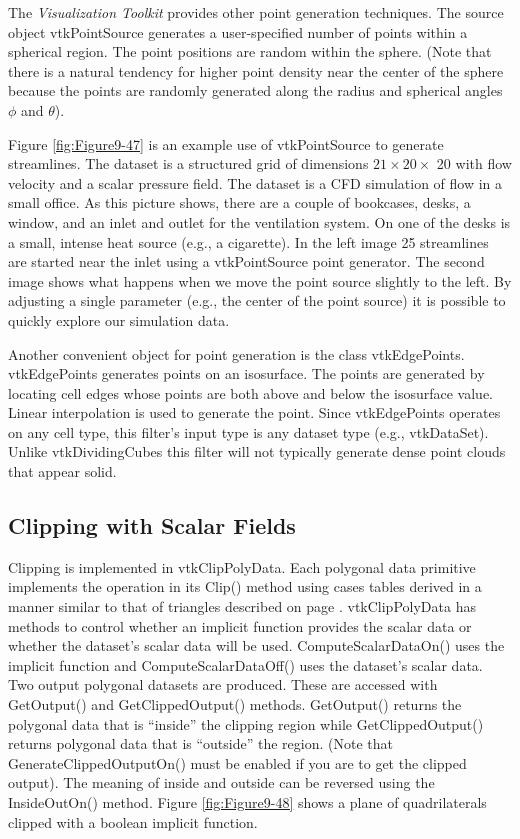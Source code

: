 The \emph{Visualization Toolkit} provides other point generation techniques. The source object vtkPointSource generates a user-specified number of points within a spherical region. The point positions are random within the sphere. (Note that there is a natural tendency for higher point density near the center of the sphere because the points are randomly generated along the radius and spherical angles $\phi$ and $\theta$).

Figure \ref{fig:Figure9-47} is an example use of vtkPointSource to generate streamlines. The dataset is a structured grid of dimensions $21 \times 20 \times$ 20 with flow velocity and a scalar pressure field. The dataset is a CFD simulation of flow in a small office. As this picture shows, there are a couple of bookcases, desks, a window, and an inlet and outlet for the ventilation system. On one of the desks is a small, intense heat source (e.g., a cigarette). In the left image 25 streamlines are started near the inlet using a vtkPointSource point generator. The second image shows what happens when we move the point source slightly to the left. By adjusting a single parameter (e.g., the center of the point source) it is possible to quickly explore our simulation data.

Another convenient object for point generation is the class vtkEdgePoints. vtkEdgePoints generates points on an isosurface. The points are generated by locating cell edges whose points are both above and below the isosurface value. Linear interpolation is used to generate the point. Since vtkEdgePoints operates on any cell type, this filter's input type is any dataset type (e.g., vtkDataSet). Unlike vtkDividingCubes this filter will not typically generate dense point clouds that appear solid.

\subsection{Clipping with Scalar Fields}

Clipping is implemented in vtkClipPolyData. Each polygonal data primitive implements the operation in its Clip() method using cases tables derived in a manner similar to that of triangles described on page \pageref{subsec:clipping_with_scalar_fields}. vtkClipPolyData has methods to control whether an implicit function provides the scalar data or whether the dataset's scalar data will be used. ComputeScalarDataOn() uses the implicit function and ComputeScalarDataOff() uses the dataset's scalar data. Two output polygonal datasets are produced. These are accessed with GetOutput() and GetClippedOutput() methods. GetOutput() returns the polygonal data that is ``inside'' the clipping region while GetClippedOutput() returns polygonal data that is ``outside'' the region. (Note that GenerateClippedOutputOn() must be enabled if you are to get the clipped output). The meaning of inside and outside can be reversed using the InsideOutOn() method. Figure \ref{fig:Figure9-48} shows a plane of quadrilaterals clipped with a boolean implicit function.

